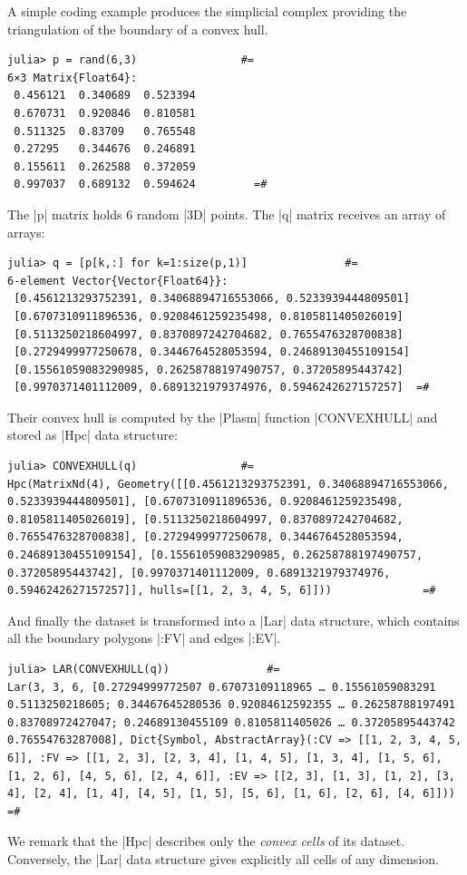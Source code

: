 \begin{coding}
A simple coding example produces the simplicial complex providing the triangulation of the boundary of a convex hull. 
\begin{lstlisting}[language=JuliaLocal, style=julia, mathescape = true]
julia> p = rand(6,3)				#=
6×3 Matrix{Float64}:
 0.456121  0.340689  0.523394
 0.670731  0.920846  0.810581
 0.511325  0.83709   0.765548
 0.27295   0.344676  0.246891
 0.155611  0.262588  0.372059
 0.997037  0.689132  0.594624		  =#
\end{lstlisting}
The |p| matrix holds 6 random |3D| points. The |q| matrix receives an array of arrays:
\begin{lstlisting}[language=JuliaLocal, style=julia, mathescape = true]
julia> q = [p[k,:] for k=1:size(p,1)]				#=
6-element Vector{Vector{Float64}}:
 [0.4561213293752391, 0.34068894716553066, 0.5233939444809501]
 [0.6707310911896536, 0.9208461259235498, 0.8105811405026019]
 [0.5113250218604997, 0.8370897242704682, 0.7655476328700838]
 [0.2729499977250678, 0.3446764528053594, 0.24689130455109154]
 [0.15561059083290985, 0.26258788197490757, 0.37205895443742]
 [0.9970371401112009, 0.6891321979374976, 0.5946242627157257]  =#
\end{lstlisting}
Their convex hull is computed by the |Plasm| function |CONVEXHULL| and stored as |Hpc| data structure:
\begin{lstlisting}[language=JuliaLocal, style=julia, mathescape = true]
julia> CONVEXHULL(q)				#=
Hpc(MatrixNd(4), Geometry([[0.4561213293752391, 0.34068894716553066, 0.5233939444809501], [0.6707310911896536, 0.9208461259235498, 0.8105811405026019], [0.5113250218604997, 0.8370897242704682, 0.7655476328700838], [0.2729499977250678, 0.3446764528053594, 0.24689130455109154], [0.15561059083290985, 0.26258788197490757, 0.37205895443742], [0.9970371401112009, 0.6891321979374976, 0.5946242627157257]], hulls=[[1, 2, 3, 4, 5, 6]]))				=#
\end{lstlisting}
And finally the dataset is transformed into a |Lar| data structure, which contains all the boundary polygons |:FV| and edges |:EV|.
\begin{lstlisting}[language=JuliaLocal, style=julia, mathescape = true]
julia> LAR(CONVEXHULL(q)) 				#=
Lar(3, 3, 6, [0.27294999772507 0.67073109118965 … 0.15561059083291 0.5113250218605; 0.34467645280536 0.92084612592355 … 0.26258788197491 0.83708972427047; 0.24689130455109 0.8105811405026 … 0.37205895443742 0.76554763287008], Dict{Symbol, AbstractArray}(:CV => [[1, 2, 3, 4, 5, 6]], :FV => [[1, 2, 3], [2, 3, 4], [1, 4, 5], [1, 3, 4], [1, 5, 6], [1, 2, 6], [4, 5, 6], [2, 4, 6]], :EV => [[2, 3], [1, 3], [1, 2], [3, 4], [2, 4], [1, 4], [4, 5], [1, 5], [5, 6], [1, 6], [2, 6], [4, 6]])) 				=#
\end{lstlisting}
We remark that the |Hpc| describes only the \emph{convex cells} of its dataset. 
Conversely, the |Lar| data structure gives explicitly all cells of any dimension. 
\end{coding}



